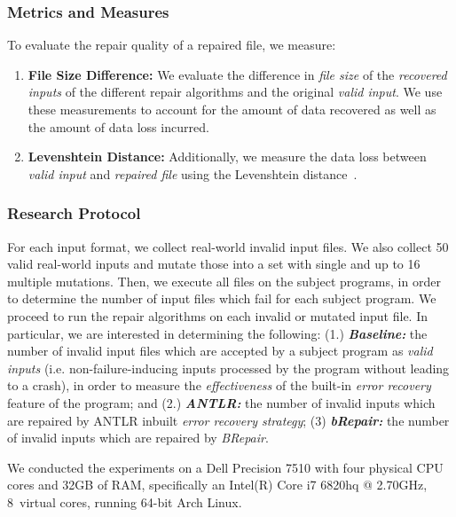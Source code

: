 \documentclass[sigconf,review,anonymous]{acmart}
\newcommand{\brepair}{\textit{BRepair}\xspace}
\begin{document}
\subsubsection*{\bf Metrics and Measures}
To evaluate the repair quality of a repaired file, we measure:
\begin{enumerate}
    \item \textbf{File Size Difference: } We evaluate the difference in \textit{file size} of the \emph{recovered inputs} of the different repair algorithms and the original \textit{valid input}.
    We use these measurements to account for the amount of data recovered as well as the amount of data loss incurred.
\item \textbf{Levenshtein Distance: } Additionally, we measure the data loss between \textit{valid input} and \textit{repaired file} using the Levenshtein distance~\cite{levDistance}.
\end{enumerate}

\subsubsection*{\bf Research Protocol}
For each input format, we collect real-world invalid input files.
We also collect 50 valid real-world inputs and mutate those into a set with single and up to 16 multiple mutations.
Then, we execute all files on the subject programs, in order to determine the number of input files which fail for each subject program.
We proceed to run the repair algorithms on each invalid or mutated input file.
In particular, we are interested in determining the following:
(1.) \textit{\textbf{Baseline:}} the number of invalid input files which are accepted by a subject program as \textit{valid inputs} (i.e. non-failure-inducing inputs processed by the program without leading to a crash), in order to measure the \textit{effectiveness} of the built-in \textit{error recovery} feature of the program;  and
(2.) \textit{\textbf{ANTLR:}} the number of invalid inputs which are repaired by ANTLR inbuilt \textit{error recovery strategy};
(3) \textit{\textbf{bRepair:}} the number of invalid inputs which are repaired by \brepair.

We conducted the experiments on a Dell Precision 7510 
with four physical CPU cores %
and 32GB of RAM, specifically an Intel(R) Core i7 6820hq @ 2.70GHz, 8~virtual cores, running 64-bit Arch Linux.
\end{document}
